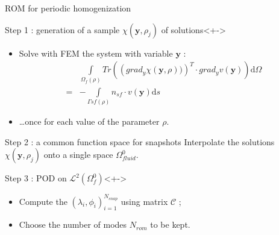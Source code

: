 \begin{frame}{ROM for periodic homogenization}
%
\begin{block}{Step 1 : generation of a sample $\chi(\mathbf{y},\rho_j)$ of solutions}<+->
\begin{itemize}
\item<+-> Solve with FEM the system with variable $\mathbf{y}$ :
\[%
\begin{split}
&\int\limits_{\Omega_f(\rho)}Tr\left(\left(grad_y\chi(\mathbf{y},\rho))\right)^T\cdot grad_y v(\mathbf{y})\right)\text{d}\Omega\\
=&-\int\limits_{\Gamma{sf}(\rho)}n_{sf}\cdot v(\mathbf{y})\text{d}s%
\end{split}
\]
\vspace{-0.7cm}
\item<+-> \dots once for each value of the parameter $\rho$.
\end{itemize}
%
\end{block}
%
\begin{block}{Step 2 : a common function space for snapshots}
Interpolate the solutions $\chi(\mathbf{y},\rho_j)$ onto a single space $\Omega_{fluid}^0$.%
\end{block}
%
\begin{block}{Step 3 : POD on $\mathcal{L}^2(\Omega_f^0)$}<+->
\begin{itemize}
\item<+-> Compute the $(\lambda_i,\phi_i)_{i=1}^{N_{snap}}$ using matrix $\mathcal{C}$ ;%
\item<+-> Choose the number of modes $N_{rom}$ to be kept.%
\end{itemize}
\end{block}
%
\end{frame}

